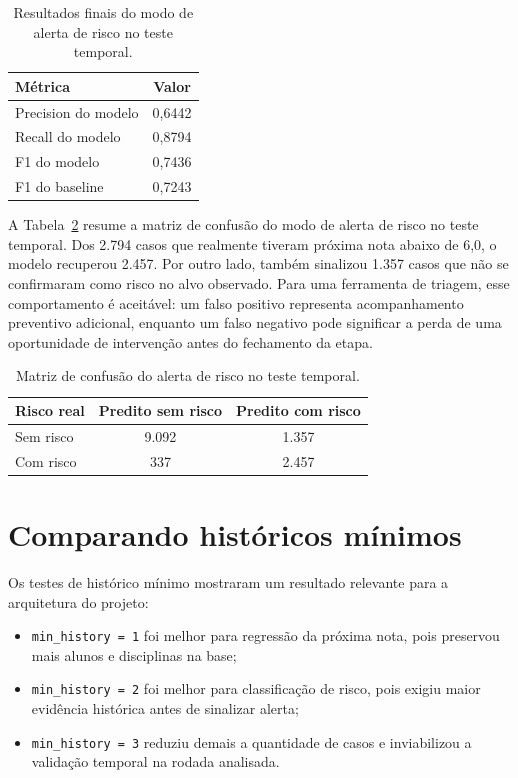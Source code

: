 \begin{table}[ht]
\caption{Resultados finais do modo de alerta de risco no teste temporal.}
\label{tab:riscos}
\centering
\begin{tabular}{l c}
\hline
\textbf{M\'etrica} & \textbf{Valor} \\
\hline
Precision do modelo & 0,6442 \\
Recall do modelo & 0,8794 \\
F1 do modelo & 0,7436 \\
F1 do baseline & 0,7243 \\
\hline
\end{tabular}
\par\smallskip{}\par
\end{table}

A Tabela~\ref{tab:matriz-risco} resume a matriz de confus\~ao do modo de alerta de risco no teste temporal. Dos 2.794 casos que realmente tiveram pr\'oxima nota abaixo de 6,0, o modelo recuperou 2.457. Por outro lado, tamb\'em sinalizou 1.357 casos que n\~ao se confirmaram como risco no alvo observado. Para uma ferramenta de triagem, esse comportamento \'e aceit\'avel: um falso positivo representa acompanhamento preventivo adicional, enquanto um falso negativo pode significar a perda de uma oportunidade de interven\c{c}\~ao antes do fechamento da etapa.

\begin{table}[ht]
\caption{Matriz de confus\~ao do alerta de risco no teste temporal.}
\label{tab:matriz-risco}
\centering
\begin{tabular}{l c c}
\hline
\textbf{Risco real} & \textbf{Predito sem risco} & \textbf{Predito com risco} \\
\hline
Sem risco & 9.092 & 1.357 \\
Com risco & 337 & 2.457 \\
\hline
\end{tabular}
\par\smallskip{}\par
\end{table}

\section{Comparando hist\'oricos m\'inimos}
\label{sec:minhistory}

Os testes de hist\'orico m\'inimo mostraram um resultado relevante para a arquitetura do projeto:
\begin{itemize}
    \item \texttt{min\_history = 1} foi melhor para regress\~ao da pr\'oxima nota, pois preservou mais alunos e disciplinas na base;
    \item \texttt{min\_history = 2} foi melhor para classifica\c{c}\~ao de risco, pois exigiu maior evid\^encia hist\'orica antes de sinalizar alerta;
    \item \texttt{min\_history = 3} reduziu demais a quantidade de casos e inviabilizou a valida\c{c}\~ao temporal na rodada analisada.
\end{itemize}

